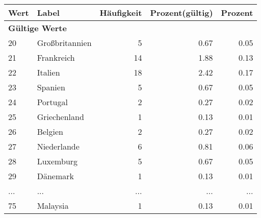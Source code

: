      \begin{longtable}{lXrrr}
     \toprule
     \textbf{Wert} & \textbf{Label} & \textbf{Häufigkeit} & \textbf{Prozent(gültig)} & \textbf{Prozent} \\
     \endhead
     \midrule
     \multicolumn{5}{l}{\textbf{Gültige Werte}}\\
        20 & \multicolumn{1}{X}{Großbritannien} & %
          \num{5} &
          \num[round-mode=places,round-precision=2]{0,67} &
          \num[round-mode=places,round-precision=2]{0,05} \\
        21 & \multicolumn{1}{X}{Frankreich} & %
          \num{14} &
          \num[round-mode=places,round-precision=2]{1,88} &
          \num[round-mode=places,round-precision=2]{0,13} \\
        22 & \multicolumn{1}{X}{Italien} & %
          \num{18} &
          \num[round-mode=places,round-precision=2]{2,42} &
          \num[round-mode=places,round-precision=2]{0,17} \\
        23 & \multicolumn{1}{X}{Spanien} & %
          \num{5} &
          \num[round-mode=places,round-precision=2]{0,67} &
          \num[round-mode=places,round-precision=2]{0,05} \\
        24 & \multicolumn{1}{X}{Portugal} & %
          \num{2} &
          \num[round-mode=places,round-precision=2]{0,27} &
          \num[round-mode=places,round-precision=2]{0,02} \\
        25 & \multicolumn{1}{X}{Griechenland} & %
          \num{1} &
          \num[round-mode=places,round-precision=2]{0,13} &
          \num[round-mode=places,round-precision=2]{0,01} \\
        26 & \multicolumn{1}{X}{Belgien} & %
          \num{2} &
          \num[round-mode=places,round-precision=2]{0,27} &
          \num[round-mode=places,round-precision=2]{0,02} \\
        27 & \multicolumn{1}{X}{Niederlande} & %
          \num{6} &
          \num[round-mode=places,round-precision=2]{0,81} &
          \num[round-mode=places,round-precision=2]{0,06} \\
        28 & \multicolumn{1}{X}{Luxemburg} & %
          \num{5} &
          \num[round-mode=places,round-precision=2]{0,67} &
          \num[round-mode=places,round-precision=2]{0,05} \\
        29 & \multicolumn{1}{X}{Dänemark} & %
          \num{1} &
          \num[round-mode=places,round-precision=2]{0,13} &
          \num[round-mode=places,round-precision=2]{0,01} \\
       ... & ... & ... & ... & ... \\
        75 & \multicolumn{1}{X}{Malaysia} & %
          \num{1} &
          \num[round-mode=places,round-precision=2]{0,13} &
          \num[round-mode=places,round-precision=2]{0,01} \\


\end{longtable}
